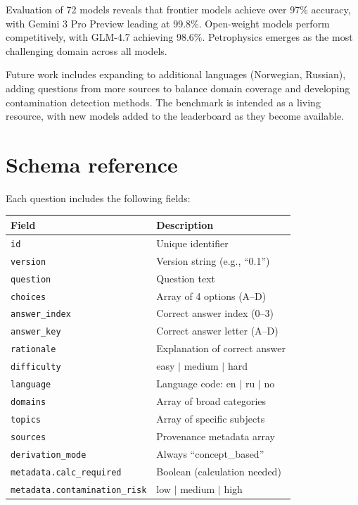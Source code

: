 \documentclass[11pt]{article}
\begin{document}
Evaluation of 72 models reveals that frontier models achieve over 97\% accuracy, with Gemini 3 Pro Preview leading at 99.8\%. Open-weight models perform competitively, with GLM-4.7 achieving 98.6\%. Petrophysics emerges as the most challenging domain across all models.

Future work includes expanding to additional languages (Norwegian, Russian), adding questions from more sources to balance domain coverage and developing contamination detection methods. The benchmark is intended as a living resource, with new models added to the leaderboard as they become available.

\FloatBarrier
\clearpage
\appendix

\section{Schema reference}

Each question includes the following fields:

\vspace{1em}
\begin{center}
\small
\begin{tabular}{ll}
  \toprule
  Field & Description \\
  \midrule
  \texttt{id} & Unique identifier \\
  \texttt{version} & Version string (e.g., ``0.1'') \\
  \texttt{question} & Question text \\
  \texttt{choices} & Array of 4 options (A--D) \\
  \texttt{answer\_index} & Correct answer index (0--3) \\
  \texttt{answer\_key} & Correct answer letter (A--D) \\
  \texttt{rationale} & Explanation of correct answer \\
  \texttt{difficulty} & easy $|$ medium $|$ hard \\
  \texttt{language} & Language code: en $|$ ru $|$ no \\
  \texttt{domains} & Array of broad categories \\
  \texttt{topics} & Array of specific subjects \\
  \texttt{sources} & Provenance metadata array \\
  \texttt{derivation\_mode} & Always ``concept\_based'' \\
  \texttt{metadata.calc\_required} & Boolean (calculation needed) \\
  \texttt{metadata.contamination\_risk} & low $|$ medium $|$ high \\
  \bottomrule
\end{tabular}
\end{center}
\vspace{1em}
\end{document}
